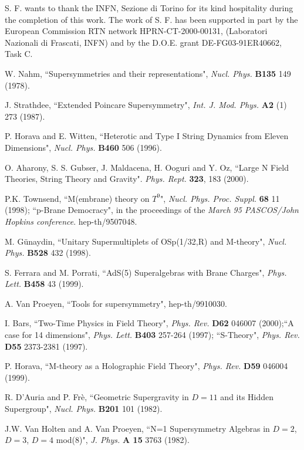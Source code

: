 \documentclass[a4paper,12pt]{article}
\begin{document}
S. F. wants to thank the INFN, Sezione di Torino for its kind
hospitality during the completion of this work.  The work of S. F.
has been supported in part by the European Commission RTN network
HPRN-CT-2000-00131, (Laboratori Nazionali di Frascati, INFN) and
by the D.O.E. grant DE-FG03-91ER40662, Task C.





\begin{thebibliography}{99}

  W. Nahm, ``Supersymmetries and their representations",
 {\it Nucl. Phys.} {\bf B135} 149 (1978).

 J. Strathdee, ``Extended Poincare Supersymmetry",
 {\it Int. J. Mod. Phys. } {\bf A2} (1) 273 (1987).

 P. Horava and E. Witten, ``Heterotic and Type I String Dynamics from Eleven Dimensions",
 {\it  Nucl. Phys. } {\bf B460} 506 (1996).

O. Aharony, S. S. Gubser, J. Maldacena, H. Ooguri and Y. Oz,
``Large N Field Theories, String Theory and Gravity". {\it Phys.
Rept.} {\bf 323}, 183 (2000).

 P.K. Townsend, ``M(embrane) theory on $T^9$",
 {\it Nucl. Phys. Proc. Suppl.} {\bf 68} 11 (1998);  ``p-Brane Democracy",
 in the proceedings of the {\it March 95 PASCOS/John
Hopkins conference}. hep-th/9507048.

 M. G\"unaydin, ``Unitary Supermultiplets of OSp(1/32,R) and M-theory",
 {\it Nucl. Phys.} {\bf B528} 432 (1998).

 S. Ferrara and M. Porrati, ``AdS(5) Superalgebras with Brane Charges",
 {\it  Phys. Lett.} {\bf B458} 43 (1999).

  A. Van Proeyen, ``Tools for supersymmetry", hep-th/9910030.

  I. Bars, ``Two-Time Physics in Field Theory",
{\it Phys. Rev.} {\bf D62} 046007 (2000);``A case for 14
dimensions", {\it Phys. Lett.} {\bf B403} 257-264 (1997);
``S-Theory", {\it Phys. Rev.} {\bf D55} 2373-2381 (1997).

 P. Horava, ``M-theory as a Holographic Field Theory",
{\it Phys. Rev.} {\bf D59} 046004 (1999).

 R. D'Auria and P. Fr\`e,
 ``Geometric Supergravity in $D = 11$ and its Hidden Supergroup",
  {\it Nucl. Phys.} {\bf B201} 101 (1982).

 J.W. Van Holten and  A. Van Proeyen,
``N=1 Supersymmetry Algebras in $D = 2$, $D = 3$, $D = 4$ mod(8)",
{\it J. Phys.} {\bf A 15} 3763 (1982).


\end{thebibliography}
\end{document}
